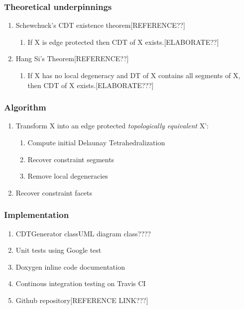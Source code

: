 \documentclass{beamer}
\begin{document}
	\begin{frame}
		\frametitle{Theoretical underpinnings}
			\begin{enumerate}
				\item	Schewchuck's CDT existence theorem[REFERENCE??]
					\begin{enumerate}
						\item If X is edge protected then CDT of X exists.[ELABORATE??]	
					\end{enumerate}		
				\item	Hang Si's Theorem[REFERENCE??]
					\begin{enumerate}
						\item If X has no local degeneracy and DT of X contains all segments of X, then CDT of X exists.[ELABORATE???] 
					\end{enumerate}		
			\end{enumerate}		
	\end{frame}	
	\begin{frame}
		\frametitle{Algorithm} 
			\begin{enumerate}
				\item Transform X into an edge protected \textit{topologically equivalent} X':	
				\begin{enumerate}
					\item Compute initial Delaunay Tetrahedralization	
					\item Recover constraint segments
					\item Remove local degeneracies
				\end{enumerate}
				\item Recover constraint facets
			\end{enumerate}		
	\end{frame}
	\begin{frame}
		\frametitle{Implementation}
			\begin{enumerate}
				\item CDTGenerator class{UML diagram class????}
				\item Unit tests using Google test
				\item Doxygen inline code documentation
				\item Continous integration testing on Travis CI	
				\item Github repository[REFERENCE LINK???]	
			\end{enumerate}
	\end{frame}	
\end{document}
